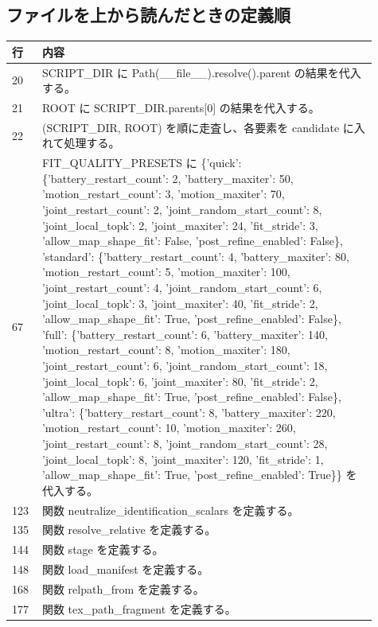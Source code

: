 \documentclass[a4paper,11pt]{article}
\begin{document}
        \subsection*{ファイルを上から読んだときの定義順}
            \begin{longtable}{p{0.07\linewidth} p{0.84\linewidth}}
            \toprule
            行 & 内容 \\
            \midrule
            20 & SCRIPT\_DIR に Path(\_\_file\_\_).resolve().parent の結果を代入する。 \\
21 & ROOT に SCRIPT\_DIR.parents[0] の結果を代入する。 \\
22 & (SCRIPT\_DIR, ROOT) を順に走査し、各要素を candidate に入れて処理する。 \\
67 & FIT\_QUALITY\_PRESETS に \{'quick': \{'battery\_restart\_count': 2, 'battery\_maxiter': 50, 'motion\_restart\_count': 3, 'motion\_maxiter': 70, 'joint\_restart\_count': 2, 'joint\_random\_start\_count': 8, 'joint\_local\_topk': 2, 'joint\_maxiter': 24, 'fit\_stride': 3, 'allow\_map\_shape\_fit': False, 'post\_refine\_enabled': False\}, 'standard': \{'battery\_restart\_count': 4, 'battery\_maxiter': 80, 'motion\_restart\_count': 5, 'motion\_maxiter': 100, 'joint\_restart\_count': 4, 'joint\_random\_start\_count': 6, 'joint\_local\_topk': 3, 'joint\_maxiter': 40, 'fit\_stride': 2, 'allow\_map\_shape\_fit': True, 'post\_refine\_enabled': False\}, 'full': \{'battery\_restart\_count': 6, 'battery\_maxiter': 140, 'motion\_restart\_count': 8, 'motion\_maxiter': 180, 'joint\_restart\_count': 6, 'joint\_random\_start\_count': 18, 'joint\_local\_topk': 6, 'joint\_maxiter': 80, 'fit\_stride': 2, 'allow\_map\_shape\_fit': True, 'post\_refine\_enabled': False\}, 'ultra': \{'battery\_restart\_count': 8, 'battery\_maxiter': 220, 'motion\_restart\_count': 10, 'motion\_maxiter': 260, 'joint\_restart\_count': 8, 'joint\_random\_start\_count': 28, 'joint\_local\_topk': 8, 'joint\_maxiter': 120, 'fit\_stride': 1, 'allow\_map\_shape\_fit': True, 'post\_refine\_enabled': True\}\} を代入する。 \\
123 & 関数 neutralize\_identification\_scalars を定義する。 \\
135 & 関数 resolve\_relative を定義する。 \\
144 & 関数 stage を定義する。 \\
148 & 関数 load\_manifest を定義する。 \\
168 & 関数 relpath\_from を定義する。 \\
177 & 関数 tex\_path\_fragment を定義する。 \\

\end{longtable}
\end{document}
